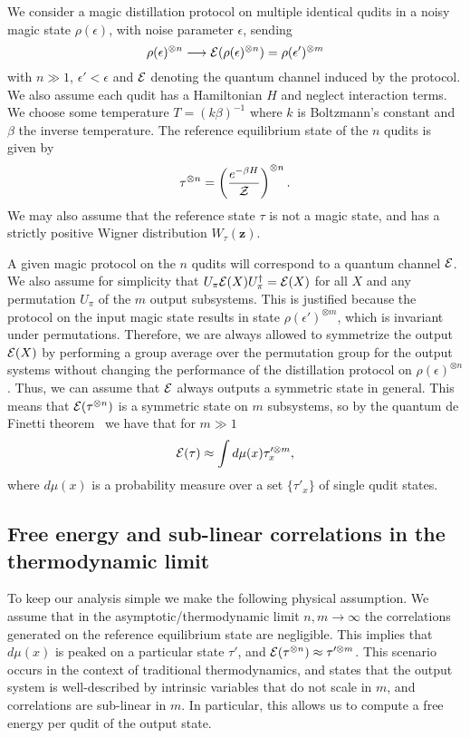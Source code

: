 \documentclass[
onecolumn,
superscriptaddress
]{revtex4-1}
\def\z{\boldsymbol{z}}
\def\Z{{\cal Z}}
\def\E{{\cal E}}
\begin{document}
We consider a magic distillation protocol on multiple identical qudits in a noisy magic state $\rho(\epsilon)$, with noise parameter $\epsilon$, sending 
\begin{equation}
\rho(\epsilon)^{\otimes n} \longrightarrow \E(\rho(\epsilon)^{\otimes n}) =\rho(\epsilon')^{\otimes m}
\end{equation}
with $n \gg 1$, $\epsilon' <\epsilon$ and $\E$ denoting the quantum channel induced by the protocol. We also assume each qudit has a Hamiltonian $H$ and neglect interaction terms. We choose some temperature $T = (k\beta)^{-1}$ where $k$ is Boltzmann's constant and $\beta$ the inverse temperature. The reference equilibrium state of the $n$ qudits is given by
\begin{equation}
\tau^{\otimes n} = \left ( \frac{e^{-\beta H}}{\Z} \right )  ^{\otimes n}.
\end{equation}
We may also assume that the reference state $\tau$ is not a magic state, and has a strictly positive Wigner distribution $W_\tau(\z)$.

A given magic protocol on the $n$ qudits will correspond to a quantum channel $\E$. We also assume for simplicity that $U_\pi\E(X) U_\pi^\dagger = \E(X)$ for all $X$ and any permutation $U_\pi$ of the $m$ output subsystems. This is justified because the protocol on the input magic state results in state $\rho(\epsilon')^{\otimes m}$, which is invariant under permutations. Therefore, we are always allowed to symmetrize the output $\E(X)$ by performing a group average over the permutation group for the output systems without changing the performance of the distillation protocol on $\rho(\epsilon)^{\otimes n}$. Thus, we can assume that $\E$ always outputs a symmetric state in general. This means that $\E(\tau^{\otimes n})$ is a symmetric state on $m$ subsystems, so by the quantum de Finetti theorem~\cite{hudson_locally_1976, christandl_2007} we have that for $m \gg 1$
\begin{equation}
\E(\tau) \approx \int d\mu(x) \tau_x^{\prime \otimes m},
\end{equation}
where $d\mu(x)$ is a probability measure over a set $\{\tau'_x\}$ of single qudit states.

\subsection*{Free energy and sub-linear correlations in the thermodynamic limit}

To keep our analysis simple we make the following physical assumption. We assume that in the asymptotic/thermodynamic limit $n,m \rightarrow \infty$ the correlations generated on the reference equilibrium state are negligible. This implies that $d\mu(x)$ is peaked on a particular state $\tau'$, and $\E(\tau^{\otimes n}) \approx \tau'^{\otimes m}$. This scenario occurs in the context of traditional thermodynamics, and states that the output system is well-described by intrinsic variables that do not scale in $m$, and correlations are sub-linear in $m$. In particular, this allows us to compute a free energy per qudit of the output state. 
\end{document}
